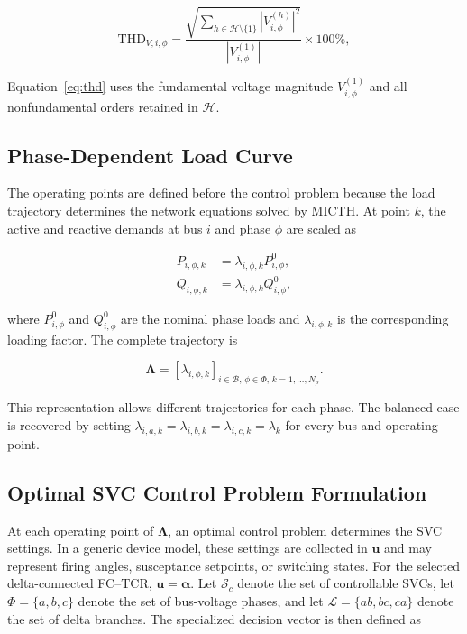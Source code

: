 \documentclass[journal]{IEEEtran}
\begin{document}
\begin{equation}
    \mathrm{THD}_{V,i,\phi} =
    \frac{\sqrt{\displaystyle\sum_{h\in\mathcal{H}\setminus\{1\}}
    \left|V_{i,\phi}^{(h)}\right|^2}}
         {\left|V_{i,\phi}^{(1)}\right|} \times 100\%,
    \label{eq:thd}
\end{equation}

Equation~\eqref{eq:thd} uses the fundamental voltage magnitude
$V_{i,\phi}^{(1)}$ and all nonfundamental orders retained in
$\mathcal{H}$.

\subsection{Phase-Dependent Load Curve}
\label{subsec:loadcurve}

The operating points are defined before the control problem because the load
trajectory determines the network equations solved by MICTH. At point $k$,
the active and reactive demands at bus $i$ and phase $\phi$ are scaled as

\begin{align}
    P_{i,\phi,k} &= \lambda_{i,\phi,k} P_{i,\phi}^{0}, \\
    Q_{i,\phi,k} &= \lambda_{i,\phi,k} Q_{i,\phi}^{0},
    \label{eq:phase_load_scaling}
\end{align}

\noindent where $P_{i,\phi}^{0}$ and $Q_{i,\phi}^{0}$ are the nominal phase
loads and $\lambda_{i,\phi,k}$ is the corresponding loading factor. The
complete trajectory is

\begin{equation}
    \boldsymbol{\Lambda} =
    \left[\lambda_{i,\phi,k}\right]_{i\in\mathcal{B},\,\phi\in\Phi,\,k=1,\ldots,N_p}.
    \label{eq:phase_load_curve}
\end{equation}

This representation allows different trajectories for each phase. The
balanced case is recovered by setting
$\lambda_{i,a,k}=\lambda_{i,b,k}=\lambda_{i,c,k}=\lambda_k$ for every bus and
operating point.

\subsection{Optimal SVC Control Problem Formulation}
\label{subsec:optim}

At each operating point of $\boldsymbol{\Lambda}$, an optimal control problem
determines the SVC settings. In a generic device model, these settings are
collected in $\mathbf{u}$ and may represent firing angles, susceptance
setpoints, or switching states. For the selected delta-connected FC--TCR,
$\mathbf{u}=\boldsymbol{\alpha}$. Let
$\mathcal{S}_c$ denote the set of controllable SVCs, let
$\Phi=\{a,b,c\}$ denote the set of bus-voltage phases, and let
$\mathcal{L}=\{ab,bc,ca\}$ denote the set of delta branches. The specialized
decision vector is then defined as
\end{document}
